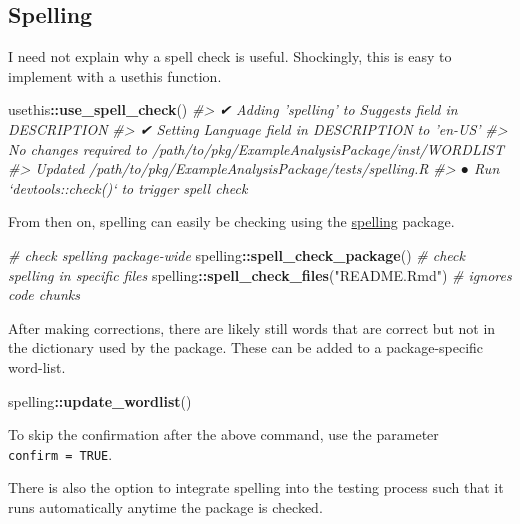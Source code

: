 \documentclass[]{book}
\newenvironment{Shaded}{\begin{snugshade}}{\end{snugshade}}
\newcommand{\KeywordTok}[1]{\textcolor[rgb]{0.13,0.29,0.53}{\textbf{#1}}}
\newcommand{\StringTok}[1]{\textcolor[rgb]{0.31,0.60,0.02}{#1}}
\newcommand{\CommentTok}[1]{\textcolor[rgb]{0.56,0.35,0.01}{\textit{#1}}}
\newcommand{\OperatorTok}[1]{\textcolor[rgb]{0.81,0.36,0.00}{\textbf{#1}}}
\newcommand{\NormalTok}[1]{#1}
\begin{document}
\subsection{Spelling}\label{spelling}

I need not explain why a spell check is useful. Shockingly, this is easy
to implement with a usethis function.

\begin{Shaded}
\begin{Highlighting}[]
\NormalTok{usethis}\OperatorTok{::}\KeywordTok{use_spell_check}\NormalTok{()}
\CommentTok{#> ✔ Adding 'spelling' to Suggests field in DESCRIPTION}
\CommentTok{#> ✔ Setting Language field in DESCRIPTION to 'en-US'}
\CommentTok{#> No changes required to /path/to/pkg/ExampleAnalysisPackage/inst/WORDLIST}
\CommentTok{#> Updated /path/to/pkg/ExampleAnalysisPackage/tests/spelling.R}
\CommentTok{#> ● Run `devtools::check()` to trigger spell check}
\end{Highlighting}
\end{Shaded}

From then on, spelling can easily be checking using the
\href{https://github.com/ropensci/spelling}{spelling} package.

\begin{Shaded}
\begin{Highlighting}[]
\CommentTok{# check spelling package-wide}
\NormalTok{spelling}\OperatorTok{::}\KeywordTok{spell_check_package}\NormalTok{()}
\CommentTok{# check spelling in specific files}
\NormalTok{spelling}\OperatorTok{::}\KeywordTok{spell_check_files}\NormalTok{(}\StringTok{"README.Rmd"}\NormalTok{)  }\CommentTok{# ignores code chunks}
\end{Highlighting}
\end{Shaded}

After making corrections, there are likely still words that are correct
but not in the dictionary used by the package. These can be added to a
package-specific word-list.

\begin{Shaded}
\begin{Highlighting}[]
\NormalTok{spelling}\OperatorTok{::}\KeywordTok{update_wordlist}\NormalTok{()}
\end{Highlighting}
\end{Shaded}

To skip the confirmation after the above command, use the parameter
\texttt{confirm\ =\ TRUE}.

There is also the option to integrate spelling into the testing process
such that it runs automatically anytime the package is checked.
\end{document}
